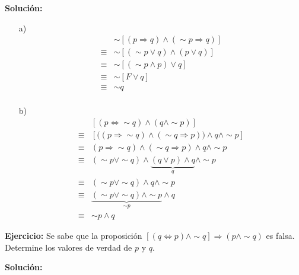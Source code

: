 \documentclass[a4paper,10pt]{article}
\begin{document}
\textbf{Solución:}
        \begin{enumerate}
            \item[a)]
                \begin{align*}
                           & \sim \left[ (p \Rightarrow q) \wedge (\sim p \Rightarrow q) \right] \\
                    \equiv & \sim \left[ (\sim p \vee q) \wedge (p \vee q) \right] \\
                    \equiv & \sim \left[ (\sim p \wedge p) \vee q \right] \\
                    \equiv & \sim \left[ F \vee q \right] \\
                    \equiv & \sim q \\
                \end{align*}

            \item[b)]
                \begin{align*}
                           & \left[ (p \Leftrightarrow \sim q) \wedge (q \wedge \sim p) \right] \\
                    \equiv & \left[ \Big( (p \Rightarrow \sim q) \wedge (\sim q \Rightarrow p) \Big) \wedge q \wedge \sim p \right] \\
                    \equiv & (p \Rightarrow \sim q) \wedge (\sim q \Rightarrow p)  \wedge q \wedge \sim p \\
                    \equiv & (\sim p \vee \sim q) \wedge \underbrace{(q \vee p)  \wedge q}_{q} \wedge \sim p \\
                    \equiv & (\sim p \vee \sim q) \wedge q \wedge \sim p \\
                    \equiv & \underbrace{(\sim p \vee \sim q) \wedge \sim p}_{\sim p} \wedge q \\
                    \equiv & \sim p \wedge q
                \end{align*}
        \end{enumerate}
        \newpage







\textbf{Ejercicio:} Se sabe que la proposición $\displaystyle \left[ (q \Leftrightarrow p) \wedge \sim q \right] \Rightarrow (p\wedge \sim q) $ es falsa. Determine los valores de verdad de $p$ y $q$. \vspace{3mm}

\textbf{Solución:}
\end{document}
